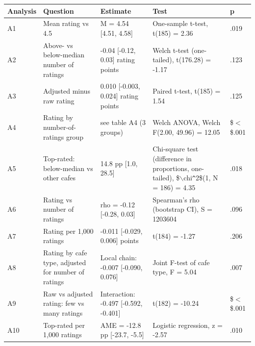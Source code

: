 \begin{table}[ht]
\centering
\begingroup\footnotesize
\begin{tabular}{lllll}
  \toprule
Analysis & Question & Estimate & Test & p \\ 
  \midrule
A1 & Mean rating vs 4.5 & M = 4.54 [4.51, 4.58] & One-sample t-test, t(185) = 2.36 & .019 \\ 
  A2 & Above- vs below-median number of ratings & -0.04 [-0.12, 0.03] rating points & Welch t-test (one-tailed), t(176.28) = -1.17 & .123 \\ 
  A3 & Adjusted minus raw rating & 0.010 [-0.003, 0.024] rating points & Paired t-test, t(185) = 1.54 & .125 \\ 
  A4 & Rating by number-of-ratings group & see table A4 (3 groups) & Welch ANOVA, Welch F(2.00, 49.96) = 12.05 & \$$<$\$.001 \\ 
  A5 & Top-rated: below-median vs other cafes & 14.8 pp [1.0, 28.5] & Chi-square test (difference in proportions, one-tailed), \$$\backslash$chi\verb|^|2\$(1, N = 186) = 4.35 & .018 \\ 
  A6 & Rating vs number of ratings & rho = -0.12 [-0.28, 0.03] & Spearman's rho (bootstrap CI), S = 1203604 & .096 \\ 
  A7 & Rating per 1,000 ratings & -0.011 [-0.029, 0.006] points & t(184) = -1.27 & .206 \\ 
  A8 & Rating by cafe type, adjusted for number of ratings & Local chain: -0.007 [-0.090, 0.076] & Joint F-test of cafe type, F = 5.04 & .007 \\ 
  A9 & Raw vs adjusted rating: few vs many ratings & Interaction: -0.497 [-0.592, -0.401] & t(182) = -10.24 & \$$<$\$.001 \\ 
  A10 & Top-rated per 1,000 ratings & AME = -12.8 pp [-23.7, -5.5] & Logistic regression, z = -2.57 & .010 \\ 
   \bottomrule
\end{tabular}
\endgroup
\end{table}
